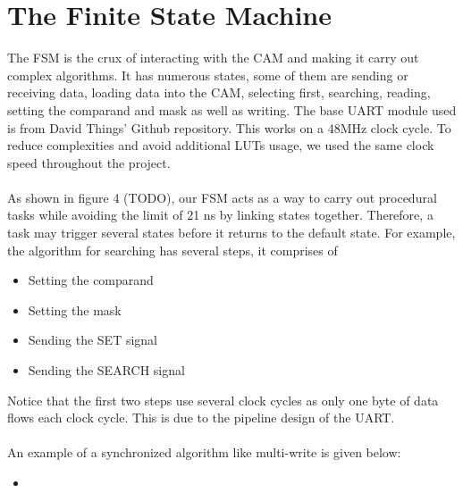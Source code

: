 \section{The Finite State Machine}
The FSM is the crux of interacting with the CAM and making it carry out complex algorithms. 
It has numerous states, some of them are sending or receiving data, loading data into the CAM, selecting first, searching, reading, setting the comparand and mask as well as writing. 
The base UART module used is from David Things' Github repository. \cite{uart} This works on a 48MHz clock cycle.
To reduce complexities and avoid additional LUTs usage, we used the same clock speed throughout the project. 
\\\\
As shown in figure 4 (TODO), our FSM acts as a way to carry out procedural tasks while avoiding the limit of 21 ns by linking states together. 
Therefore, a task may trigger several states before it returns to the default state. 
For example, the algorithm for searching has several steps, it comprises of
\begin{itemize}
    \item Setting the comparand 
    \item Setting the mask 
    \item Sending the SET signal 
    \item Sending the SEARCH signal 
\end{itemize}
Notice that the first two steps use several clock cycles as only one byte of data flows each clock cycle. 
This is due to the pipeline design of the UART. 
\\\\
An example of a synchronized algorithm like multi-write is given below:
\begin{itemize}
    \item 
\end{itemize}